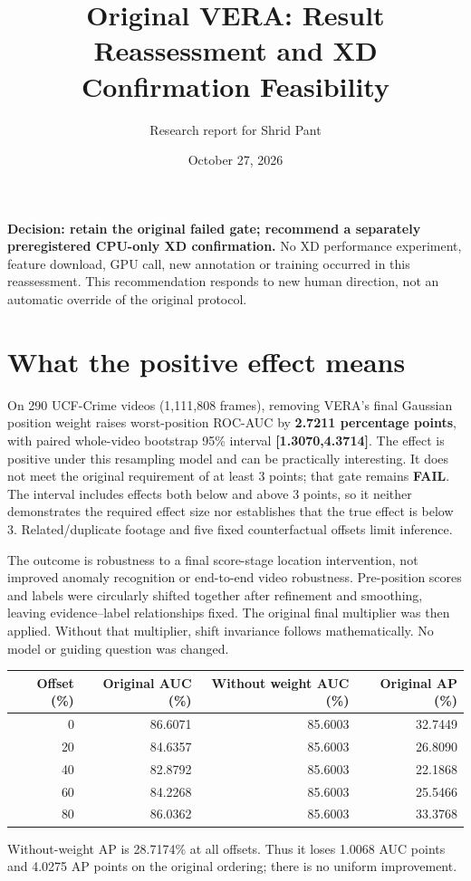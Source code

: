 \documentclass[10pt]{article}
\title{Original VERA: Result Reassessment and XD Confirmation Feasibility}
\author{Research report for Shrid Pant}\date{October 27, 2026}
\begin{document}
\maketitle
\textbf{Decision: retain the original failed gate; recommend a separately preregistered CPU-only XD confirmation.} No XD performance experiment, feature download, GPU call, new annotation or training occurred in this reassessment. This recommendation responds to new human direction, not an automatic override of the original protocol.

\section{What the positive effect means}
On 290 UCF-Crime videos (1,111,808 frames), removing VERA's final Gaussian position weight raises worst-position ROC-AUC by \textbf{2.7211 percentage points}, with paired whole-video bootstrap 95\% interval \textbf{[1.3070,4.3714]}. The effect is positive under this resampling model and can be practically interesting. It does not meet the original requirement of at least 3 points; that gate remains \textbf{FAIL}. The interval includes effects both below and above 3 points, so it neither demonstrates the required effect size nor establishes that the true effect is below 3. Related/duplicate footage and five fixed counterfactual offsets limit inference.

The outcome is robustness to a final score-stage location intervention, not improved anomaly recognition or end-to-end video robustness. Pre-position scores and labels were circularly shifted together after refinement and smoothing, leaving evidence--label relationships fixed. The original final multiplier was then applied. Without that multiplier, shift invariance follows mathematically. No model or guiding question was changed.

\begin{center}\begin{tabular}{rrrr}\toprule
Offset (\%) & Original AUC (\%) & Without weight AUC (\%) & Original AP (\%)\\\midrule
0 &86.6071&85.6003&32.7449\\
20&84.6357&85.6003&26.8090\\
40&82.8792&85.6003&22.1868\\
60&84.2268&85.6003&25.5466\\
80&86.0362&85.6003&33.3768\\\bottomrule
\end{tabular}\end{center}
Without-weight AP is 28.7174\% at all offsets. Thus it loses 1.0068 AUC points and 4.0275 AP points on the original ordering; there is no uniform improvement.
\end{document}
